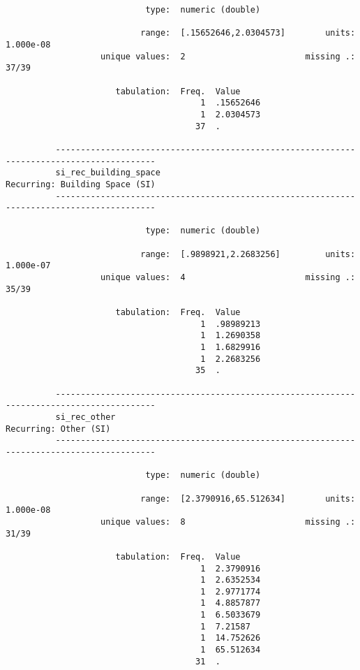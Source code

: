 \documentclass{article}
\begin{document}
\begin{verbatim}
                            type:  numeric (double)
          
                           range:  [.15652646,2.0304573]        units:  1.000e-08
                   unique values:  2                        missing .:  37/39
          
                      tabulation:  Freq.  Value
                                       1  .15652646
                                       1  2.0304573
                                      37  .
          
          ------------------------------------------------------------------------------------------
          si_rec_building_space                                       Recurring: Building Space (SI)
          ------------------------------------------------------------------------------------------
          
                            type:  numeric (double)
          
                           range:  [.9898921,2.2683256]         units:  1.000e-07
                   unique values:  4                        missing .:  35/39
          
                      tabulation:  Freq.  Value
                                       1  .98989213
                                       1  1.2690358
                                       1  1.6829916
                                       1  2.2683256
                                      35  .
          
          ------------------------------------------------------------------------------------------
          si_rec_other                                                         Recurring: Other (SI)
          ------------------------------------------------------------------------------------------
          
                            type:  numeric (double)
          
                           range:  [2.3790916,65.512634]        units:  1.000e-08
                   unique values:  8                        missing .:  31/39
          
                      tabulation:  Freq.  Value
                                       1  2.3790916
                                       1  2.6352534
                                       1  2.9771774
                                       1  4.8857877
                                       1  6.5033679
                                       1  7.21587
                                       1  14.752626
                                       1  65.512634
                                      31  .
          

\end{verbatim}
\end{document}
